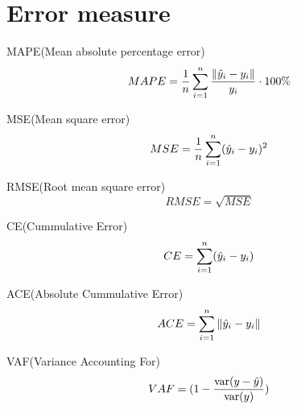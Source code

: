 \documentclass{book}
\begin{document}
\section{Error measure}
MAPE(Mean absolute percentage error)
$$ MAPE = \dfrac{1}{n} \sum_{i=1}^n \dfrac{\left\Vert \hat{y}_i - y_i\right\Vert}{y_i} \cdot 100\%$$

MSE(Mean square error)
$$MSE = \dfrac{1}{n} \sum_{i=1}^n (\hat{y}_i - y_i)^2$$

RMSE(Root mean square error)
$$RMSE  = \sqrt{MSE}$$

CE(Cummulative Error)
$$CE = \sum_{i=1}^n (\hat{y}_i - y_i)$$

ACE(Absolute Cummulative Error)
$$ACE = \sum_{i=1}^n \left\Vert \hat{y}_i - y_i\right\Vert$$

VAF(Variance Accounting For)
$$VAF = (1 - \dfrac{\operatorname{var}(y - \hat{y})}{\operatorname{var}(y)})$$
\end{document}

